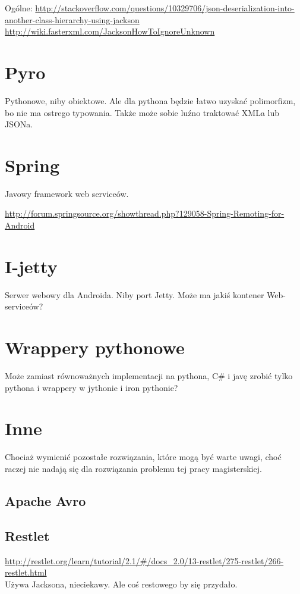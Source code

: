Ogólne:
\url{http://stackoverflow.com/questions/10329706/json-deserialization-into-another-class-hierarchy-using-jackson}\\
\url{http://wiki.fasterxml.com/JacksonHowToIgnoreUnknown}\\

\section{Pyro}
Pythonowe, niby obiektowe. Ale dla pythona będzie łatwo uzyskać polimorfizm, bo nie ma ostrego typowania. Także może sobie luźno traktować XMLa lub JSONa.

\section{Spring}
Javowy framework web serviceów.

\url{http://forum.springsource.org/showthread.php?129058-Spring-Remoting-for-Android}\\


\section{I-jetty}
Serwer webowy dla Androida. Niby port Jetty. Może ma jakiś kontener Web-serviceów?

\section{Wrappery pythonowe}
Może zamiast równoważnych implementacji na pythona, C\# i javę zrobić tylko pythona i wrappery w jythonie i iron pythonie?


\section{Inne}
Chociaż wymienić pozostałe rozwiązania, które mogą być warte uwagi, choć raczej nie nadają się dla rozwiązania problemu tej pracy magisterskiej.

\subsection{Apache Avro}

\subsection{Restlet}
\url{http://restlet.org/learn/tutorial/2.1/#/docs_2.0/13-restlet/275-restlet/266-restlet.html}\\
Używa Jacksona, nieciekawy. Ale coś restowego by się przydało.

